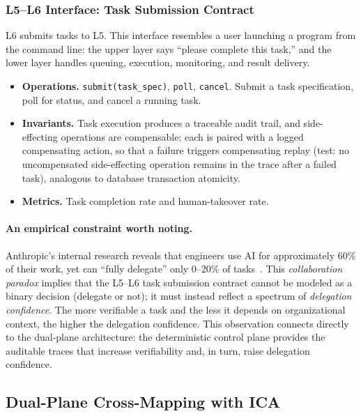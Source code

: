 \subsubsection{L5--L6 Interface: Task Submission Contract}

L6 submits tasks to L5. This interface resembles a user launching a program from the command line: the upper layer says ``please complete this task,'' and the lower layer handles queuing, execution, monitoring, and result delivery.

\begin{itemize}[nosep]
\item \textbf{Operations.}
\texttt{submit(task\_spec)}, \texttt{poll}, \texttt{cancel}.
Submit a task specification, poll for status, and cancel a running task.
\item \textbf{Invariants.}
Task execution produces a traceable audit trail, and side-effecting operations are compensable: each is paired with a logged compensating action, so that a failure triggers compensating replay (test: no uncompensated side-effecting operation remains in the trace after a failed task), analogous to database transaction atomicity.
\item \textbf{Metrics.}
Task completion rate and human-takeover rate.
\end{itemize}

\paragraph{An empirical constraint worth noting.}
Anthropic's internal research reveals that engineers use AI for approximately 60\% of their work, yet can ``fully delegate'' only 0--20\% of tasks~\cite{anthropic2026agenticreport}.
This \textit{collaboration paradox} implies that the L5--L6 task submission contract cannot be modeled as a binary decision (delegate or not); it must instead reflect a spectrum of \textit{delegation confidence}. The more verifiable a task and the less it depends on organizational context, the higher the delegation confidence.
This observation connects directly to the dual-plane architecture: the deterministic control plane provides the auditable traces that increase verifiability and, in turn, raise delegation confidence.

\subsection{Dual-Plane Cross-Mapping with ICA}
\label{sec:dual-plane-icam}

